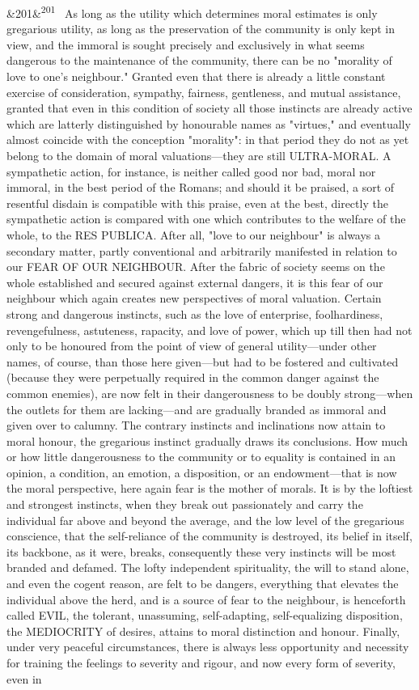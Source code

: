 \documentclass[12pt]{article}
\newcommand{\para}[1][]{\par\noindent\ifx&#1&\else\textsuperscript{\footnotesize #1}~\fi}
\begin{document}
\para[201] As long as the utility which determines moral estimates is only gregarious utility, as long as the preservation of the community is only kept in view, and the immoral is sought precisely and exclusively in what seems dangerous to the maintenance of the community, there can be no "morality of love to one's neighbour." Granted even that there is already a little constant exercise of consideration, sympathy, fairness, gentleness, and mutual assistance, granted that even in this condition of society all those instincts are already active which are latterly distinguished by honourable names as "virtues," and eventually almost coincide with the conception "morality": in that period they do not as yet belong to the domain of moral valuations---they are still ULTRA-MORAL. A sympathetic action, for instance, is neither called good nor bad, moral nor immoral, in the best period of the Romans; and should it be praised, a sort of resentful disdain is compatible with this praise, even at the best, directly the sympathetic action is compared with one which contributes to the welfare of the whole, to the RES PUBLICA. After all, "love to our neighbour" is always a secondary matter, partly conventional and arbitrarily manifested in relation to our FEAR OF OUR NEIGHBOUR. After the fabric of society seems on the whole established and secured against external dangers, it is this fear of our neighbour which again creates new perspectives of moral valuation. Certain strong and dangerous instincts, such as the love of enterprise, foolhardiness, revengefulness, astuteness, rapacity, and love of power, which up till then had not only to be honoured from the point of view of general utility---under other names, of course, than those here given---but had to be fostered and cultivated (because they were perpetually required in the common danger against the common enemies), are now felt in their dangerousness to be doubly strong---when the outlets for them are lacking---and are gradually branded as immoral and given over to calumny. The contrary instincts and inclinations now attain to moral honour, the gregarious instinct gradually draws its conclusions. How much or how little dangerousness to the community or to equality is contained in an opinion, a condition, an emotion, a disposition, or an endowment---that is now the moral perspective, here again fear is the mother of morals. It is by the loftiest and strongest instincts, when they break out passionately and carry the individual far above and beyond the average, and the low level of the gregarious conscience, that the self-reliance of the community is destroyed, its belief in itself, its backbone, as it were, breaks, consequently these very instincts will be most branded and defamed. The lofty independent spirituality, the will to stand alone, and even the cogent reason, are felt to be dangers, everything that elevates the individual above the herd, and is a source of fear to the neighbour, is henceforth called EVIL, the tolerant, unassuming, self-adapting, self-equalizing disposition, the MEDIOCRITY of desires, attains to moral distinction and honour. Finally, under very peaceful circumstances, there is always less opportunity and necessity for training the feelings to severity and rigour, and now every form of severity, even in 
\end{document}
